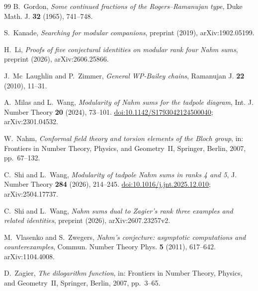 \begin{thebibliography}{99}
B.~Gordon, \emph{Some continued fractions of the Rogers--Ramanujan type}, Duke Math. J. \textbf{32} (1965), 741--748.

S.~Kanade, \emph{Searching for modular companions}, preprint (2019), arXiv:1902.05199.

H.~Li, \emph{Proofs of five conjectural identities on modular rank four Nahm sums}, preprint (2026), arXiv:2606.25866.

J.~Mc~Laughlin and P.~Zimmer, \emph{General WP-Bailey chains}, Ramanujan J. \textbf{22} (2010), 11--31.

A.~Milas and L.~Wang, \emph{Modularity of Nahm sums for the tadpole diagram}, Int. J. Number Theory \textbf{20} (2024), 73--101. \href{https://doi.org/10.1142/S1793042124500040}{doi:10.1142/S1793042124500040}; arXiv:2301.04532.

W.~Nahm, \emph{Conformal field theory and torsion elements of the Bloch group}, in: Frontiers in Number Theory, Physics, and Geometry~II, Springer, Berlin, 2007, pp.~67--132.

C.~Shi and L.~Wang, \emph{Modularity of tadpole Nahm sums in ranks 4 and 5}, J. Number Theory \textbf{284} (2026), 214--245. \href{https://doi.org/10.1016/j.jnt.2025.12.010}{doi:10.1016/j.jnt.2025.12.010}; arXiv:2504.17737.

C.~Shi and L.~Wang, \emph{Nahm sums dual to Zagier's rank three examples and related identities}, preprint (2026), arXiv:2607.23257v2.

M.~Vlasenko and S.~Zwegers, \emph{Nahm's conjecture: asymptotic computations and counterexamples}, Commun. Number Theory Phys. \textbf{5} (2011), 617--642. arXiv:1104.4008.

D.~Zagier, \emph{The dilogarithm function}, in: Frontiers in Number Theory, Physics, and Geometry~II, Springer, Berlin, 2007, pp.~3--65.

\end{thebibliography}
